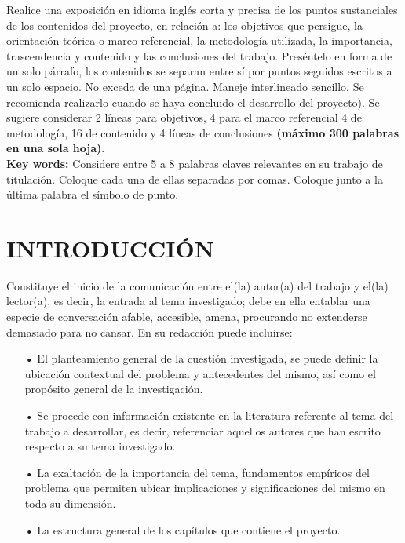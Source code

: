 \documentclass[12pt, a4paper, nofontenc, numbers=endperiod]{apa7}
\begin{document}
{			\setlength{\parindent}{0cm}\singlespacing Realice una exposición en idioma inglés corta y precisa de los puntos sustanciales de los contenidos del proyecto, en relación a: los objetivos que persigue, la orientación teórica o marco referencial, la metodología utilizada, la importancia, trascendencia y contenido y las conclusiones del trabajo. Preséntelo en forma de un solo párrafo, los contenidos se separan entre sí por puntos seguidos escritos a un solo espacio. No exceda de una página. Maneje interlineado sencillo. Se recomienda realizarlo cuando se haya concluido el desarrollo del proyecto). Se sugiere considerar 2 líneas para objetivos, 4 para el marco referencial 4 de metodología, 16 de contenido y 4 líneas de conclusiones \textbf{(máximo 300 palabras en una sola hoja)}.\\
			
			\setlength{\parindent}{0cm}\textbf{Key words:} Considere entre 5 a 8 palabras claves relevantes en su trabajo de titulación. Coloque cada una de ellas separadas por comas. Coloque junto a la última palabra el símbolo de punto.
			
		}
		\newpage
		{ %
			\section*{\large \centering INTRODUCCIÓN}
			\setlength{\parindent}{1.27cm}Constituye el inicio de la comunicación entre el(la) autor(a) del trabajo y el(la) lector(a), es decir, la entrada al tema investigado; debe en ella entablar una especie de conversación afable, accesible, amena, procurando no extenderse demasiado para no cansar. En su redacción puede incluirse: 
			{\doublespacing
				\begin{itemize}[leftmargin=1.70cm]
					\item[•] El planteamiento general de la cuestión investigada, se puede definir la ubicación contextual del problema y antecedentes del mismo, así como el propósito general de la investigación.
					\item[•] Se procede con información existente en la literatura referente al tema del trabajo a desarrollar, es decir, referenciar aquellos autores que han escrito respecto a su tema investigado.
					\item[•] La exaltación de la importancia del tema, fundamentos empíricos del problema que permiten ubicar implicaciones y significaciones del mismo en toda su dimensión.
					\item[•] La estructura general de los capítulos que contiene el proyecto.
				\end{itemize}
			}
			\newpage}
\end{document}
